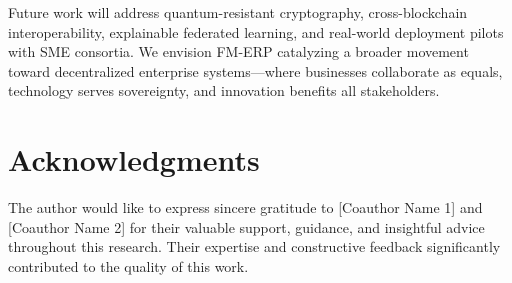 \documentclass[times,10pt,twocolumn]{jucs2e}
\begin{document}
Future work will address quantum-resistant cryptography, cross-blockchain interoperability, explainable federated learning, and real-world deployment pilots with SME consortia. We envision FM-ERP catalyzing a broader movement toward decentralized enterprise systems---where businesses collaborate as equals, technology serves sovereignty, and innovation benefits all stakeholders.


\section*{Acknowledgments}

The author would like to express sincere gratitude to [Coauthor Name 1] and [Coauthor Name 2] for their valuable support, guidance, and insightful advice throughout this research. Their expertise and constructive feedback significantly contributed to the quality of this work.





\end{document}
